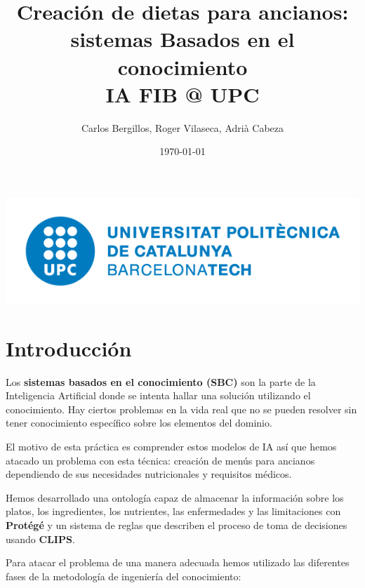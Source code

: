 \documentclass[12]{article}
\date{\today}
\author{Carlos Bergillos, Roger Vilaseca, Adrià Cabeza}
\title{Creación de dietas para ancianos: \\ sistemas Basados en el conocimiento \\
	\large IA FIB @ UPC}
\begin{document}
\maketitle
\vspace*{\fill}
\begin{center}
\includegraphics[scale=0.5]{images/UPClogo.png}
\end{center}
\newpage
\tableofcontents
\newpage
\section{Introducción} %

Los \textbf{sistemas basados en el conocimiento (SBC)} son la parte de la Inteligencia Artificial donde se intenta hallar una solución utilizando el conocimiento. Hay ciertos problemas en la vida real que no se pueden resolver sin tener conocimiento específico sobre los elementos del dominio. 
\par
El motivo de esta práctica es comprender estos modelos de IA así que hemos atacado un problema con esta técnica: creación de menús para ancianos dependiendo de sus necesidades nutricionales y requisitos médicos. 
\par
Hemos desarrollado una ontología capaz de almacenar la información sobre los platos, los ingredientes, los nutrientes, las enfermedades y las limitaciones con \textbf{Protégé} y un sistema de reglas que describen el proceso de toma de decisiones usando \textbf{CLIPS}.
\par
Para atacar el problema de una manera adecuada hemos utilizado las diferentes fases de la metodología de ingeniería del conocimiento: 
\end{document}
